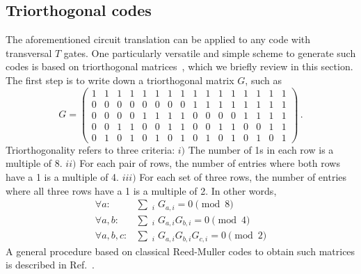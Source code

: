 \documentclass[prx,aps,letterpaper,twocolumn,allowfontchageintitle=true,accepted=2019-02-01]{quantumarticle}
\begin{document}
\subsection{Triorthogonal codes}

The aforementioned circuit translation can be applied to any code with transversal $T$ gates. One particularly versatile and simple scheme to generate such codes is based on triorthogonal matrices~\cite{Bravyi2012,Haah2018}, which we briefly review in this section. The first step is to write down a triorthogonal matrix $G$, such as
\begin{equation}
G = \begin{pmatrix}
	1 & 1 & 1 & 1 & 1 & 1 & 1 & 1 & 1 & 1 & 1 & 1 & 1 & 1 & 1 & 1 \\
	0 & 0 & 0 & 0 & 0 & 0 & 0 & 0 & 1 & 1 & 1 & 1 & 1 & 1 & 1 & 1 \\
	0 & 0 & 0 & 0 & 1 & 1 & 1 & 1 & 0 & 0 & 0 & 0 & 1 & 1 & 1 & 1 \\
	0 & 0 & 1 & 1 & 0 & 0 & 1 & 1 & 0 & 0 & 1 & 1 & 0 & 0 & 1 & 1 \\
	0 & 1 & 0 & 1 & 0 & 1 & 0 & 1 & 0 & 1 & 0 & 1 & 0 & 1 & 0 & 1
\end{pmatrix} \, .
\label{eqn:15to1}
\end{equation}
Triorthogonality refers to three criteria: $i)$ The number of 1s in each row is a multiple of 8. $ii)$ For each pair of rows, the number of entries where both rows have a 1 is a multiple of 4. $iii)$ For each set of three rows, the number of entries where all three rows have a 1 is a multiple of 2. In other words,
\begin{equation}
	\begin{split}
	\forall a:& \sum\mathop{}_{i}  G_{a,i} = 0 \pmod 8 \\
	\forall a,b:& \sum\mathop{}_{i} G_{a,i} G_{b,i} = 0 \pmod 4 \\
	\forall a,b,c:& \sum\mathop{}_{i} G_{a,i} G_{b,i} G_{c,i} = 0 \pmod 2
	\end{split}
	\label{eqn:triorth}
\end{equation}
A general procedure based on classical Reed-Muller codes to obtain such matrices is described in Ref.~\cite{Haah2018}. 
\end{document}
